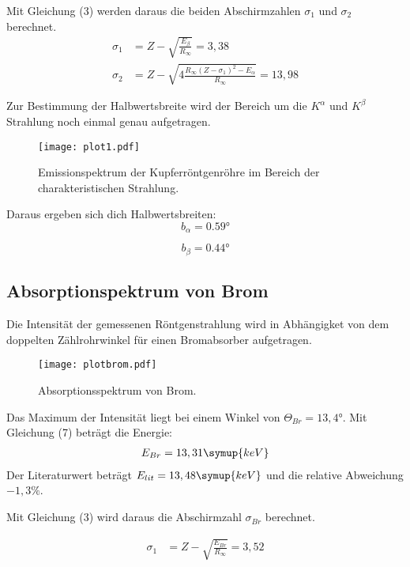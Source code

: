 Mit Gleichung (3) werden daraus die beiden Abschirmzahlen $\sigma_1$ und $\sigma_2$ berechnet.
\begin{align*}
  \sigma_1 &= Z - \sqrt{\frac{E_{\beta}}{R_{\infty}}} = 3,38 \\
  \sigma_2 &= Z - \sqrt{4 \frac{R_{\infty} (Z-\sigma_1)^2 - E_{\alpha}}{R_{\infty}}} = 13,98
\end{align*}

Zur Bestimmung der Halbwertsbreite wird der Bereich um die $K^{\alpha}$ und $K^{\beta}$ Strahlung
noch einmal genau aufgetragen.

\begin{figure}
  \centering
  \texttt{[image: plot1.pdf]}
  \caption{Emissionspektrum der Kupferröntgenröhre im Bereich der charakteristischen Strahlung.}
  \label{fig:plot1}
\end{figure}

Daraus ergeben sich dich Halbwertsbreiten:
\begin{equation*}
  b_{\alpha} = 0.59°
\end{equation*}

\begin{equation*}
  b_{\beta} = 0.44°
\end{equation*}


\subsection{Absorptionspektrum von Brom}

Die Intensität der gemessenen Röntgenstrahlung wird in Abhängigket von dem doppelten Zählrohrwinkel für
einen Bromabsorber aufgetragen.

\begin{figure}[H]
  \centering
  \texttt{[image: plotbrom.pdf]}
  \caption{Absorptionsspektrum von Brom.}
  \label{fig:plot}
\end{figure}

Das Maximum der Intensität liegt bei einem Winkel von $\Theta_{Br} = 13,4°$.
Mit Gleichung (7) beträgt die Energie:
\begin{align*}
  E_{Br} = 13,31 \symup{keV}
\end{align*}
Der Literaturwert beträgt $E_{lit} = 13,48 \symup{keV}$ und die relative Abweichung $-1,3\%$.

Mit Gleichung (3) wird daraus die Abschirmzahl $\sigma_{Br}$  berechnet.

\begin{align*}
  \sigma_1 &= Z - \sqrt{\frac{E_{Br}}{R_{\infty}}} = 3,52 \\
\end{align*}

